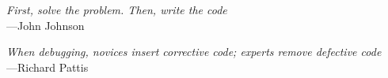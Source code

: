 %
\begin{frontmatter}

%
%
\makefrontmatter

%
%
%
%
%
%

%
%



%
%

\begin{epigraph}
  \emph{First, solve the problem. Then, write the code}\\
  ---John Johnson


  \emph{When debugging, novices insert corrective code; experts remove defective code}\\
  ---Richard Pattis
\end{epigraph}

%
\tableofcontents

\renewcommand{\glossarysection}[2][]{
\newpage
\noindent
\centerline{LIST OF ABBREVIATIONS}
}


\end{frontmatter}
